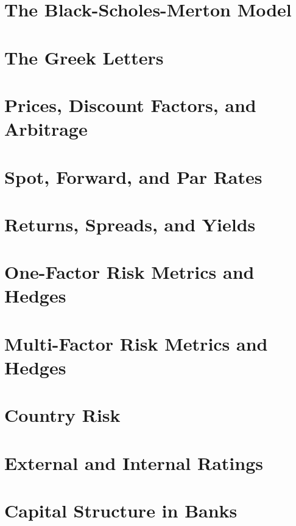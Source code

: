 \documentclass[11pt,fleqn]{report} %
\numberwithin{equation}{section} %
\numberwithin{figure}{section} %
\numberwithin{table}{section} %
\begin{document}
\chapter{The Black-Scholes-Merton Model}
 
\chapter{The Greek Letters}

\chapter{Prices, Discount Factors, and Arbitrage}

\chapter{Spot, Forward, and Par Rates}

\chapter{Returns, Spreads, and Yields}

\chapter{One-Factor Risk Metrics and Hedges}

\chapter{Multi-Factor Risk Metrics and Hedges}

\chapter{Country Risk}

\chapter{External and Internal Ratings}

\chapter{Capital Structure in Banks}
\end{document}
